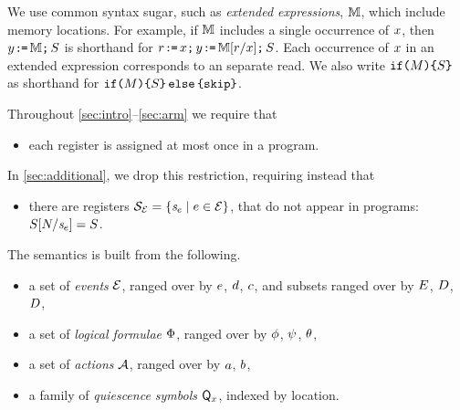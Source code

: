 We use common syntax sugar, such as \emph{extended expressions}, $\mathbb{M}$,
which include memory locations.  For example, if $\mathbb{M}$ includes a single
occurrence of $x$, then $y\mkern1mu\texttt{:}\mkern-1mu\texttt{=}\,\mathbb{M}\texttt{;}\,\allowbreak S$ is shorthand for
$r\mkern1mu\texttt{:}\mkern-1mu\texttt{=}\,x\texttt{;}\,\allowbreak y\mkern1mu\texttt{:}\mkern-1mu\texttt{=}\,\mathbb{M}[r/x]\texttt{;}\,\allowbreak S$.  Each
occurrence of $x$ in an extended expression corresponds to an separate
read.  We also write $\texttt{if}\,\allowbreak\!\texttt{(}M\texttt{)} \allowbreak\texttt{\{} S \texttt{\}}$ as shorthand for
$\texttt{if}\,\allowbreak\!\texttt{(}M\texttt{)} \allowbreak\texttt{\{} S\texttt{\}}\,\allowbreak\texttt{else}\,\allowbreak\texttt{\{} \texttt{skip}\texttt{\}}$.



Throughout \textsection\ref{sec:intro}--\ref{sec:arm} we 
require that
\begin{itemize}
\item each register is assigned at most once in a program.
\end{itemize}
In \textsection\ref{sec:additional}, we drop this restriction, requiring
instead that
\begin{itemize}
\item there are registers
  $\mathcal{S}_{\mathcal{E}}=\{\mathit{s}_{e}\mid e\in\mathcal{E}\}$, that do not
  appear in programs: $S[N/\mathit{s}_{e}]=S$.
\end{itemize}

The semantics is built from the following.
\begin{itemize}
\item a set of \emph{events} $\mathcal{E}$, ranged over by $e$, $d$,
  $c$, %
  and subsets ranged over by $E$, $D$, $D$,  
\item a set of \emph{logical formulae} $\Phi$, ranged over by $\phi$,
  $\psi$, $\theta$,
\item a set of \emph{actions} $\mathcal{A}$, ranged over by $a$, $b$,
\item a family of \emph{quiescence symbols} $\mathsf{Q}_{x}$, indexed by location.
\end{itemize}

